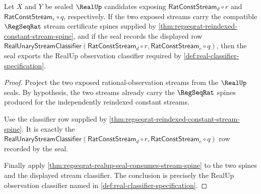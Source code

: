 \begin{theorem}
\label{thm:regseqrat-constant-stream-seal-classifier-package}
Let $X$ and $Y$ be sealed $\RealUp$ candidates exposing
$\mathsf{RatConstStream}_d\circ r$ and
$\mathsf{RatConstStream}_e\circ q$, respectively. If the two exposed streams
carry the compatible $\RegSeqRat$ stream certificate spines supplied by
\autoref{thm:regseqrat-reindexed-constant-stream-spine}, and if the seal
records the displayed row
$\mathsf{RealUnaryStreamClassifier}(\mathsf{RatConstStream}_d\circ r,
\mathsf{RatConstStream}_e\circ q)$, then the seal exports the RealUp
observation classifier required by
\autoref{def:real-classifier-specification}.
\end{theorem}
\begin{proof}
Project the two exposed rational-observation streams from the $\RealUp$ seals.
By hypothesis, the two streams already carry the $\RegSeqRat$ spines produced
for the independently reindexed constant streams.

Use the classifier row supplied by
\autoref{thm:regseqrat-reindexed-constant-stream-spine}. It is exactly the
$\mathsf{RealUnaryStreamClassifier}(\mathsf{RatConstStream}_d\circ r,
\mathsf{RatConstStream}_e\circ q)$ row recorded by the seal.

Finally apply \autoref{thm:regseqrat-realup-seal-consumes-stream-spine} to the
two spines and the displayed stream classifier. The conclusion is precisely
the RealUp observation classifier named in
\autoref{def:real-classifier-specification}.
\end{proof}
